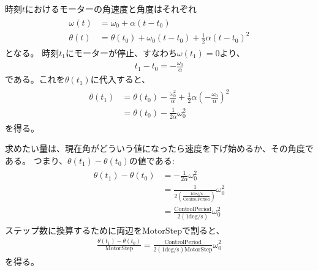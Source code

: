 \documentclass[letterpaper,10pt,dvipdfmx]{sphinxmanual}
\begin{document}
時刻\(t\)におけるモーターの角速度と角度はそれぞれ
\begin{equation*}
\begin{split}\begin{aligned}
\omega(t)&=\omega_0+\alpha(t-t_0) \\
\theta(t)&=\theta(t_0)+\omega_0(t-t_0)+\frac{1}{2}\alpha(t-t_0)^2\end{aligned}\end{split}
\end{equation*}
となる。
時刻\(t_1\)にモーターが停止、すなわち\(\omega(t_1)=0\)より、
\begin{equation*}
\begin{split}t_1-t_0=-\frac{\omega_0}{\alpha}\end{split}
\end{equation*}
である。これを\(\theta(t_1)\)に代入すると、
\begin{equation*}
\begin{split}\begin{aligned}
\theta(t_1)&=\theta(t_0)-\frac{\omega_0^2}{\alpha}
+\frac{1}{2}\alpha\left(-\frac{\omega_0}{\alpha}\right)^2 \\
&=\theta(t_0)-\frac{1}{2\alpha}\omega_0^2\end{aligned}\end{split}
\end{equation*}
を得る。

求めたい量は、現在角がどういう値になったら速度を下げ始めるか、その角度である。
つまり、\(\theta(t_1)-\theta(t_0)\)の値である:
\begin{equation*}
\begin{split}\begin{aligned}
\theta(t_1)-\theta(t_0)&=-\frac{1}{2\alpha}\omega_0^2 \\
&=\frac{1}{2\left(\frac{1 \mathrm{deg/s}}{\mathrm{ControlPeriod}}\right)}\omega_0^2 \\
&=\frac{\mathrm{ControlPeriod}}{2(1 \mathrm{deg/s})}\omega_0^2\end{aligned}\end{split}
\end{equation*}
ステップ数に換算するために両辺を\(\mathrm{MotorStep}\)で割ると、
\begin{equation*}
\begin{split}\frac{\theta(t_1)-\theta(t_0)}{\mathrm{MotorStep}}
=\frac{\mathrm{ControlPeriod}}{2(1 \mathrm{deg/s})\mathrm{MotorStep}}\omega_0^2\end{split}
\end{equation*}
を得る。
\end{document}
